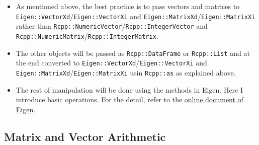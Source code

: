 \documentclass[
]{book}
\providecommand{\tightlist}{%
  \setlength{\itemsep}{0pt}\setlength{\parskip}{0pt}}
\begin{document}
\begin{itemize}
\tightlist
\item
  As mentioned above, the best practice is to pass vectors and matrices to \texttt{Eigen::VectorXd}/\texttt{Eigen::VectorXi} and \texttt{Eigen::MatrixXd}/\texttt{Eigen::MatrixXi} rather than \texttt{Rcpp::NumericVector}/\texttt{Rcpp::IntegerVector} and \texttt{Rcpp::NumericMatrix}/\texttt{Rcpp::IntegerMatrix}.
\item
  The other objects will be passed as \texttt{Rcpp::DataFrame} or \texttt{Rcpp::List} and at the end converted to \texttt{Eigen::VectorXd}/\texttt{Eigen::VectorXi} and \texttt{Eigen::MatrixXd}/\texttt{Eigen::MatrixXi} usin \texttt{Rcpp::as} as explained above.
\item
  The rest of manipulation will be done using the methods in Eigen. Here I introduce basic operations. For the detail, refer to the \href{https://eigen.tuxfamily.org/dox/GettingStarted.html}{online document of Eigen}.
\end{itemize}

\hypertarget{matrix-and-vector-arithmetic}{%
\subsection{Matrix and Vector Arithmetic}\label{matrix-and-vector-arithmetic}}
\end{document}
